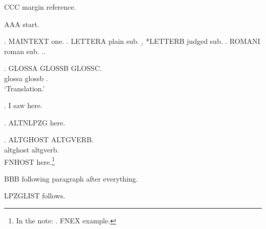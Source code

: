 
\noindent CCC margin reference.

AAA start.

\ex. MAINTEXT one.
\a. LETTERA plain sub.
\b. *LETTERB judged sub.
\a. ROMANI roman sub.
\z.\z.

\exg. GLOSSA GLOSSB GLOSSC.\\
      glossa glossb .\\
\glt `Translation.'

\ex. I saw  here.

\ex. ALTNLPZG  here.

\exg. ALTGHOST  ALTGVERB.\\
      altghost  altgverb.\\

FNHOST here.\footnote{In the note: \ex. FNEX example.

}

\begin{exe}
\end{exe}

BBB following paragraph after everything.

LPZGLIST follows.
\lpzglist[ignore={3}]


